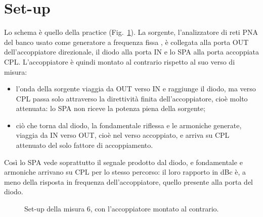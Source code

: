 \documentclass[11pt,a4paper,oneside]{book}
\begin{document}
\section{Set-up}
Lo schema è quello della practice (Fig.~\ref{fig:6_setup}). La sorgente, l'analizzatore di reti PNA del banco usato come generatore a frequenza fissa , è collegata alla porta OUT dell'accoppiatore direzionale, il diodo alla porta IN e lo SPA alla porta accoppiata CPL. L'accoppiatore è quindi montato al contrario rispetto al suo verso di misura:
\begin{itemize}
  \item l'onda della sorgente viaggia da OUT verso IN e raggiunge il diodo, ma verso CPL passa solo attraverso la direttività finita dell'accoppiatore, cioè molto attenuata: lo SPA non riceve la potenza piena della sorgente;
  \item ciò che torna dal diodo, la fondamentale riflessa e le armoniche generate, viaggia da IN verso OUT, cioè nel verso accoppiato, e arriva su CPL attenuato del solo fattore di accoppiamento.
\end{itemize}
Così lo SPA vede soprattutto il segnale prodotto dal diodo, e fondamentale e armoniche arrivano su CPL per lo stesso percorso: il loro rapporto in dBc è, a meno della risposta in frequenza dell'accoppiatore, quello presente alla porta del diodo.

\begin{figure}[H]
\centering
{}
\caption{Set-up della misura 6, con l'accoppiatore montato al contrario.}
\label{fig:6_setup}
\end{figure}
\end{document}
